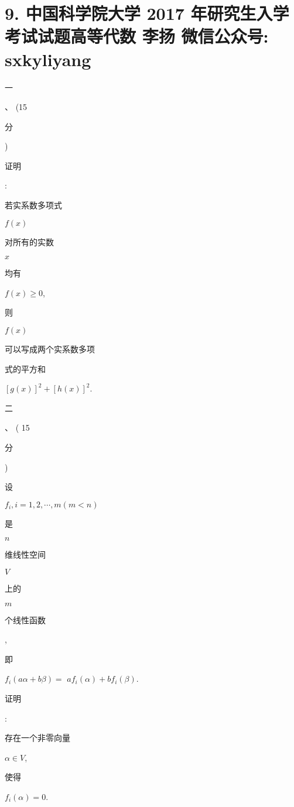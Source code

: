 \documentclass[10pt]{article}
\begin{document}
\section{9. 中国科学院大学 2017 年研究生入学考试试题高等代数 
 李扬 
 微信公众号: sxkyliyang}
\begin{CJK}{UTF8}{mj}一\end{CJK}、 (15 \begin{CJK}{UTF8}{mj}分\end{CJK}) \begin{CJK}{UTF8}{mj}证明\end{CJK}: \begin{CJK}{UTF8}{mj}若实系数多项式\end{CJK} $f(x)$ \begin{CJK}{UTF8}{mj}对所有的实数\end{CJK} $x$ \begin{CJK}{UTF8}{mj}均有\end{CJK} $f(x) \geq 0$, \begin{CJK}{UTF8}{mj}则\end{CJK} $f(x)$ \begin{CJK}{UTF8}{mj}可以写成两个实系数多项\end{CJK} \begin{CJK}{UTF8}{mj}式的平方和\end{CJK} $[g(x)]^{2}+[h(x)]^{2}$.

\begin{CJK}{UTF8}{mj}二\end{CJK}、 ( 15 \begin{CJK}{UTF8}{mj}分\end{CJK}) \begin{CJK}{UTF8}{mj}设\end{CJK} $f_{i}, i=1,2, \cdots, m(m<n)$ \begin{CJK}{UTF8}{mj}是\end{CJK} $n$ \begin{CJK}{UTF8}{mj}维线性空间\end{CJK} $V$ \begin{CJK}{UTF8}{mj}上的\end{CJK} $m$ \begin{CJK}{UTF8}{mj}个线性函数\end{CJK}, \begin{CJK}{UTF8}{mj}即\end{CJK} $f_{i}(a \alpha+b \beta)=$ $a f_{i}(\alpha)+b f_{i}(\beta)$. \begin{CJK}{UTF8}{mj}证明\end{CJK}: \begin{CJK}{UTF8}{mj}存在一个非零向量\end{CJK} $\alpha \in V$, \begin{CJK}{UTF8}{mj}使得\end{CJK} $f_{i}(\alpha)=0$.
\end{document}
